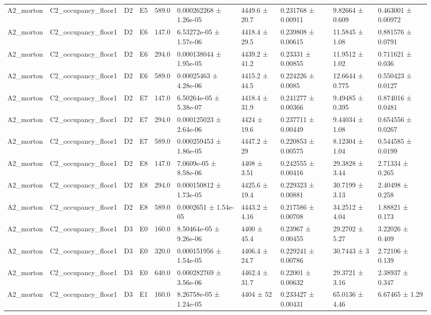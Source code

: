 \begin{table}
\begin{tabular}{llllllllll}
A2\_morton & C2\_occupancy\_floor1 & D2 & E5 & 589.0 & 0.000262268 ± 1.26e-05 & 4449.6 ± 20.7 & 0.231768 ± 0.00911 & 9.82664 ± 0.609 & 0.463001 ± 0.00972 \\
A2\_morton & C2\_occupancy\_floor1 & D2 & E6 & 147.0 & 6.53272e-05 ± 1.57e-06 & 4418.4 ± 29.5 & 0.239808 ± 0.00615 & 11.5845 ± 1.08 & 0.881576 ± 0.0791 \\
A2\_morton & C2\_occupancy\_floor1 & D2 & E6 & 294.0 & 0.000138044 ± 1.95e-05 & 4439.2 ± 41.2 & 0.23331 ± 0.00855 & 11.9512 ± 1.02 & 0.711621 ± 0.036 \\
A2\_morton & C2\_occupancy\_floor1 & D2 & E6 & 589.0 & 0.00025463 ± 4.28e-06 & 4415.2 ± 44.5 & 0.224226 ± 0.0085 & 12.6644 ± 0.775 & 0.550423 ± 0.0127 \\
A2\_morton & C2\_occupancy\_floor1 & D2 & E7 & 147.0 & 6.50264e-05 ± 5.38e-07 & 4418.4 ± 31.9 & 0.241277 ± 0.00366 & 9.49485 ± 0.395 & 0.874016 ± 0.0481 \\
A2\_morton & C2\_occupancy\_floor1 & D2 & E7 & 294.0 & 0.000125023 ± 2.64e-06 & 4424 ± 19.6 & 0.237711 ± 0.00449 & 9.44034 ± 1.08 & 0.654556 ± 0.0267 \\
A2\_morton & C2\_occupancy\_floor1 & D2 & E7 & 589.0 & 0.000259453 ± 1.86e-05 & 4447.2 ± 29 & 0.220853 ± 0.00575 & 8.12304 ± 1.04 & 0.544585 ± 0.0199 \\
A2\_morton & C2\_occupancy\_floor1 & D2 & E8 & 147.0 & 7.0609e-05 ± 8.58e-06 & 4408 ± 3.51 & 0.242555 ± 0.00416 & 29.3828 ± 3.44 & 2.71334 ± 0.265 \\
A2\_morton & C2\_occupancy\_floor1 & D2 & E8 & 294.0 & 0.000150812 ± 1.73e-05 & 4425.6 ± 19.4 & 0.229323 ± 0.00881 & 30.7199 ± 3.13 & 2.40498 ± 0.258 \\
A2\_morton & C2\_occupancy\_floor1 & D2 & E8 & 589.0 & 0.0002651 ± 1.54e-05 & 4443.2 ± 4.16 & 0.217586 ± 0.00708 & 34.2512 ± 4.04 & 1.88821 ± 0.173 \\
A2\_morton & C2\_occupancy\_floor1 & D3 & E0 & 160.0 & 8.50464e-05 ± 9.26e-06 & 4400 ± 45.4 & 0.23967 ± 0.00455 & 29.2702 ± 5.27 & 3.22026 ± 0.409 \\
A2\_morton & C2\_occupancy\_floor1 & D3 & E0 & 320.0 & 0.000151956 ± 1.54e-05 & 4406.4 ± 24.7 & 0.229241 ± 0.00786 & 30.7443 ± 3 & 2.72106 ± 0.139 \\
A2\_morton & C2\_occupancy\_floor1 & D3 & E0 & 640.0 & 0.000282769 ± 3.56e-06 & 4462.4 ± 31.7 & 0.22001 ± 0.00632 & 29.3721 ± 3.16 & 2.38937 ± 0.347 \\
A2\_morton & C2\_occupancy\_floor1 & D3 & E1 & 160.0 & 8.26758e-05 ± 1.24e-05 & 4404 ± 52 & 0.233427 ± 0.00431 & 65.0136 ± 4.46 & 6.67465 ± 1.29 \\

\end{tabular}
\end{table}
